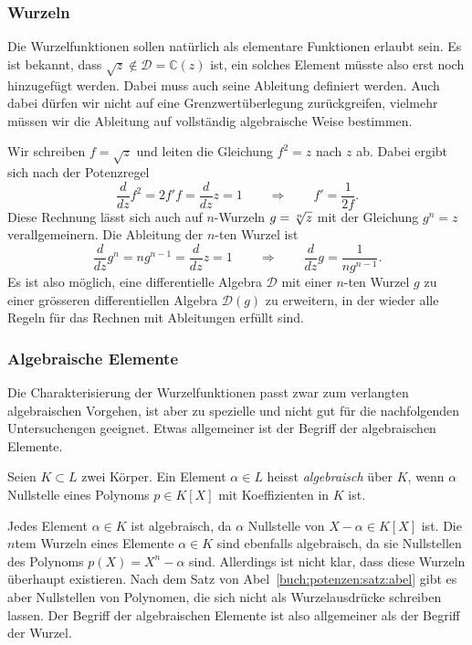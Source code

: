 \subsubsection{Wurzeln}
Die Wurzelfunktionen sollen natürlich als elementare Funktionen
erlaubt sein.
Es ist bekannt, dass $\sqrt{z}\not\in \mathscr{D}=\mathbb{C}(z)$
ist, ein solches Element müsste also erst noch hinzugefügt werden.
Dabei muss auch seine Ableitung definiert werden.
Auch dabei dürfen wir nicht auf eine Grenzwertüberlegung zurückgreifen,
vielmehr müssen wir die Ableitung auf vollständig algebraische
Weise bestimmen.

Wir schreiben $f=\sqrt{z}$ und leiten die Gleichung $f^2=z$ nach $z$ ab.
Dabei ergibt sich nach der Potenzregel
\[
\frac{d}{dz}f^2 = 2f'f = \frac{d}{dz}z=1
\qquad\Rightarrow\qquad f' = \frac{1}{2f}.
\]
Diese Rechnung lässt sich auch auf $n$-Wurzeln $g=\root{n}\of{z}$ mit
der Gleichung $g^n = z$ verallgemeinern.
Die Ableitung der $n$-ten Wurzel ist
\begin{equation}
\frac{d}{dz}g^n
=
ng^{n-1} = \frac{d}{dz}z=1
\qquad\Rightarrow\qquad
\frac{d}{dz}g = \frac{1}{ng^{n-1}}.
\end{equation}
Es ist also möglich, eine differentielle Algebra $\mathscr{D}$ mit einer
$n$-ten Wurzel $g$ zu einer grösseren differentiellen Algebra $\mathscr{D}(g)$
zu erweitern, in der wieder alle Regeln für das Rechnen mit Ableitungen
erfüllt sind.

\subsubsection{Algebraische Elemente}
Die Charakterisierung der Wurzelfunktionen passt zwar zum verlangten
algebraischen Vorgehen, ist aber zu spezielle und nicht gut für die
nachfolgenden Untersuchengen geeignet.
Etwas allgemeiner ist der Begriff der algebraischen Elemente.

\begin{definition}
\label{buch:integrale:def:algebraisches-element}
Seien $K\subset L$ zwei Körper.
Ein Element $\alpha \in L$ heisst {\em algebraisch} über $K$,
wenn $\alpha$ Nullstelle eines Polynoms $p\in K[X]$ mit Koeffizienten
in $K$ ist.
%
\end{definition}

Jedes Element $\alpha\in K$ ist algebraisch, da $\alpha$ Nullstelle
von $X-\alpha\in K[X]$ ist.
Die $n$tem Wurzeln eines Elemente $\alpha\in K$ sind ebenfalls algebraisch,
da sie Nullstellen des Polynoms $p(X) = X^n - \alpha$ sind.
Allerdings ist nicht klar, dass diese Wurzeln überhaupt existieren.
Nach dem Satz von Abel~\ref{buch:potenzen:satz:abel} gibt es aber
Nullstellen von Polynomen, die sich nicht als Wurzelausdrücke schreiben
lassen.
Der Begriff der algebraischen Elemente ist also allgemeiner als der
Begriff der Wurzel.

